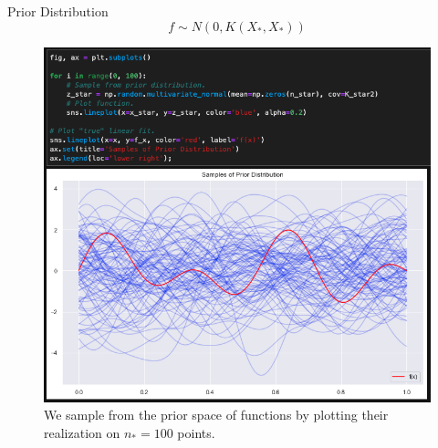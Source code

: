 \documentclass[10pt]{beamer}
\begin{document}
\begin{frame}{Prior Distribution}
$$
f \sim N(0, K(X_*,X_*))
$$
\begin{center}
\begin{figure}
\includegraphics[scale=0.27]{images/code_sample_prior_example2.png} 
\caption{We sample from the prior space of functions by plotting their realization on $n_*=100$ points. }
\end{figure}
\end{center}
\end{frame}
\end{document}
